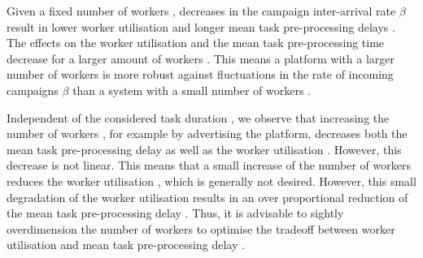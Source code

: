 Given a fixed number of workers \numberOfWorkers, decreases in the campaign inter-arrival rate \(\beta\) result in lower worker utilisation \workerUtilization and longer mean task pre-processing delays \preTaskProcessingDelay.
The effects on the worker utilisation \workerUtilization and the mean task pre-processing time \preTaskProcessingDelay decrease for a larger amount of workers \numberOfWorkers.
This means a platform with a larger number of workers is more robust against fluctuations in the rate of incoming campaigns \(\beta\) than a system with a small number of workers \numberOfWorkers.

Independent of the considered task duration \taskDuration, we observe that increasing the number of workers \numberOfWorkers, for example by advertising the platform, decreases both the mean task pre-processing delay \preTaskProcessingDelay as well as the worker utilisation \workerUtilization.
However, this decrease is not linear.
This means that a small increase of the number of workers \numberOfWorkers reduces the worker utilisation \workerUtilization, which is generally not desired.
However, this small degradation of the worker utilisation \workerUtilization results in an over proportional reduction of the mean task pre-processing delay \preTaskProcessingDelay.
Thus, it is advisable to sightly overdimension the number of workers \numberOfWorkers to optimise the tradeoff between worker utilisation \workerUtilization and mean task pre-processing delay \preTaskProcessingDelay.
